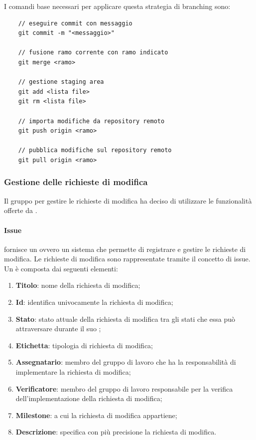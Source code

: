 I comandi base necessari per applicare questa strategia di branching sono:
\begin{lstlisting}    
    // eseguire commit con messaggio
    git commit -m "<messaggio>" 

    // fusione ramo corrente con ramo indicato
    git merge <ramo>

    // gestione staging area
    git add <lista file>
    git rm <lista file>

    // importa modifiche da repository remoto
    git push origin <ramo>

    // pubblica modifiche sul repository remoto
    git pull origin <ramo>
\end{lstlisting}

\subsubsection{Gestione delle richieste di modifica}
Il gruppo per gestire le richieste di modifica ha deciso di utilizzare le funzionalità offerte da .

\paragraph{Issue}
 fornisce un  ovvero un sistema che permette di registrare e gestire le richieste di modifica.
Le richieste di modifica sono rappresentate tramite il concetto di issue.
Un  è composta dai seguenti elementi:
\begin{enumerate}
    \item \textbf{Titolo}: nome della richiesta di modifica;
   
    \item \textbf{Id}: identifica univocamente la richiesta di modifica;
   
    \item \textbf{Stato}: stato attuale della richiesta di modifica tra gli stati che essa può attraversare durante il suo ;
   
    \item \textbf{Etichetta}: tipologia di richiesta di modifica;
   
    \item \textbf{Assegnatario}: membro del gruppo di lavoro che ha la responsabilità di implementare la richiesta di modifica;
    
    \item \textbf{Verificatore}: membro del gruppo di lavoro responsabile per la verifica dell'implementazione della richiesta di modifica;
   
    \item \textbf{Milestone}:  a cui la richiesta di modifica appartiene;
   
    \item \textbf{Descrizione}: specifica con più precisione la richiesta di modifica.
\end{enumerate}

